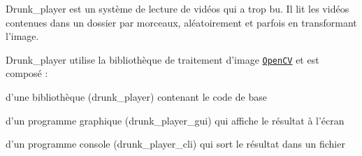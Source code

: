 Drunk\+\_\+player est un système de lecture de vidéos qui a trop bu. Il lit les vidéos contenues dans un dossier par morceaux, aléatoirement et parfois en transformant l'image.

Drunk\+\_\+player utilise la bibliothèque de traitement d'image \href{https://opencv.org/}{\tt Open\+C\+V} et est composé \+:


\begin{DoxyItemize}
\item d'une bibliothèque (drunk\+\_\+player) contenant le code de base
\item d'un programme graphique (drunk\+\_\+player\+\_\+gui) qui affiche le résultat à l'écran
\item d'un programme console (drunk\+\_\+player\+\_\+cli) qui sort le résultat dans un fichier 
\end{DoxyItemize}